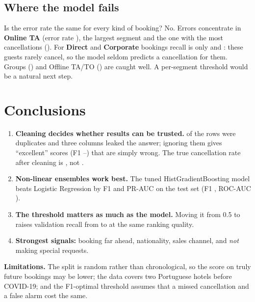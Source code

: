 \subsection{Where the model fails}
\begin{table}[H]\centering\small
\caption{Test errors by market segment (segments with at least 50 test bookings).}\label{tb:tab-segments}

\end{table}
\begin{finding}
\Q Is the error rate the same for every kind of booking?
\F No. Errors concentrate in \textbf{Online TA} (error rate \TBSegOnlineErr), the largest segment and the one with the most
cancellations (\TBSegOnlineCancel). For \textbf{Direct} and \textbf{Corporate} bookings recall is only \TBSegDirectRecall{} and
\TBSegCorpRecall: these guests rarely cancel, so the model seldom predicts a cancellation for them. Groups
(\TBSegGroupsRecall) and Offline TA/TO (\TBSegOfflineRecall) are caught well. A per-segment threshold would be a natural
next step.
\end{finding}

\section{Conclusions}\label{tb:conclusion}
\begin{enumerate}
\item \textbf{Cleaning decides whether results can be trusted.} \TBDupPct{} of the rows were duplicates and three columns
leaked the answer; ignoring them gives ``excellent'' scores (F1 \TBNodupF{}–\TBLeakF) that are simply wrong. The true
cancellation rate after cleaning is \TBCancelClean, not \TBCancelRaw.
\item \textbf{Non-linear ensembles work best.} The tuned HistGradientBoosting model beats Logistic Regression by \TBGainF{}
F1 and \TBGainPR{} PR-AUC on the test set (F1 \TBTestFinF, ROC-AUC \TBTestFinROC).
\item \textbf{The threshold matters as much as the model.} Moving it from 0.5 to \TBThr{} raises validation recall from
\TBImbDefR{} to \TBImbThrR{} at the same ranking quality.
\item \textbf{Strongest signals:} booking far ahead, nationality, sales channel, and \emph{not} making special requests.
\end{enumerate}
\textbf{Limitations.} The split is random rather than chronological, so the score on truly future bookings may be lower;
the data covers two Portuguese hotels before COVID-19; and the F1-optimal threshold assumes that a missed cancellation and a
false alarm cost the same.

